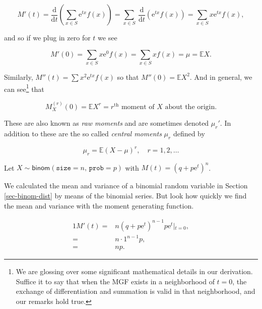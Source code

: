 \documentclass[]{book}
\let\rmarkdownfootnote\footnote%
\def\footnote{\protect\rmarkdownfootnote}
\numberwithin{equation}{chapter}
\numberwithin{figure}{chapter}
\theoremstyle{plain}
\theoremstyle{definition}
\theoremstyle{remark}
\theoremstyle{definition}
\theoremstyle{definition}
\theoremstyle{remark}
\let\BeginKnitrBlock\begin \let\EndKnitrBlock\end
\begin{document}
\begin{equation}
M'(t)=\frac{\mathrm{d}}{\mathrm{d} t}\left(\sum_{x\in S}\mathrm{e}^{tx}f(x)\right)=\sum_{x\in S}\ \frac{\mathrm{d}}{\mathrm{d} t}\left(\mathrm{e}^{tx}f(x)\right)=\sum_{x\in S}x\mathrm{e}^{tx}f(x),
\end{equation}

and so if we plug in zero for \(t\) we see

\begin{equation}
M'(0)=\sum_{x\in S}x\mathrm{e}^{0}f(x)=\sum_{x\in S}xf(x)=\mu=\mathbb{E} X.
\end{equation}

Similarly, \(M''(t) = \sum x^{2} \mathrm{e}^{tx} f(x)\) so that
\(M''(0) = \mathbb{E} X^{2}\). And in general, we can see\footnote{We
  are glossing over some significant mathematical details in our
  derivation. Suffice it to say that when the MGF exists in a
  neighborhood of \(t=0\), the exchange of differentiation and summation
  is valid in that neighborhood, and our remarks hold true.} that

\begin{equation}
M_{X}^{(r)}(0)=\mathbb{E} X^{r}=\mbox{\(r^{\mathrm{th}}\) moment of \(X\) about the origin.}
\end{equation}

These are also known as \emph{raw moments} and are sometimes denoted
\(\mu_{r}'\). In addition to these are the so called \emph{central
moments} \(\mu_{r}\) defined by

\begin{equation}
\mu_{r}=\mathbb{E}(X-\mu)^{r},\quad r=1,2,\ldots
\end{equation}

\bigskip

\BeginKnitrBlock{example}
\protect\hypertarget{ex:unnamed-chunk-219}{}{\label{ex:unnamed-chunk-219}}Let
\(X \sim \mathsf{binom}(\mathtt{size} = n,\,\mathtt{prob} = p)\) with
\(M(t) = (q + p \mathrm{e}^{t})^{n}\).
\EndKnitrBlock{example}

We calculated the mean and variance of a binomial random variable in
Section \ref{sec-binom-dist} by means of the binomial series. But look
how quickly we find the mean and variance with the moment generating
function.

\begin{alignat*}{1}
M'(t)= & n(q+p\mathrm{e}^{t})^{n-1}p\mathrm{e}^{t}\left|_{t=0}\right.,\\
= & n\cdot1^{n-1}p,\\
= & np.
\end{alignat*}
\end{document}
